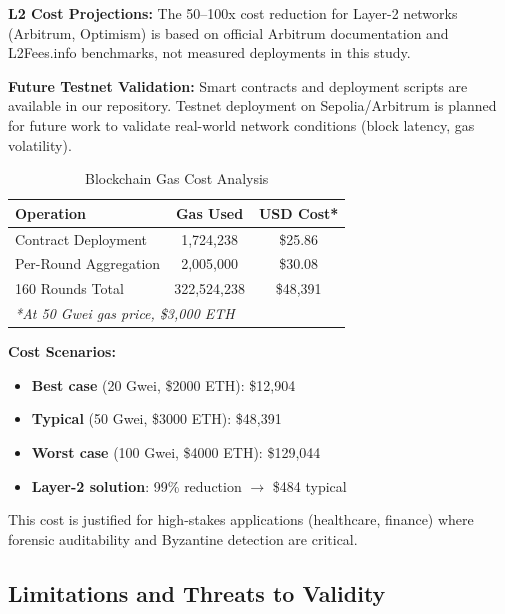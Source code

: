 \documentclass[12pt,a4paper,onecolumn]{article}
\begin{document}
\textbf{L2 Cost Projections:} The 50--100x cost reduction for Layer-2 networks (Arbitrum, Optimism) is based on official Arbitrum documentation and L2Fees.info benchmarks, not measured deployments in this study.

\textbf{Future Testnet Validation:} Smart contracts and deployment scripts are available in our repository. Testnet deployment on Sepolia/Arbitrum is planned for future work to validate real-world network conditions (block latency, gas volatility).

\begin{table}[t]
\caption{Blockchain Gas Cost Analysis}
\label{tab:gas_cost}
\centering
\begin{tabular}{lcc}
\toprule
\textbf{Operation} & \textbf{Gas Used} & \textbf{USD Cost*} \\
\midrule
Contract Deployment & 1,724,238 & \$25.86 \\
Per-Round Aggregation & 2,005,000 & \$30.08 \\
160 Rounds Total & 322,524,238 & \$48,391 \\
\midrule
\multicolumn{3}{l}{\textit{*At 50 Gwei gas price, \$3,000 ETH}} \\
\bottomrule
\end{tabular}
\end{table}

\textbf{Cost Scenarios:}
\begin{itemize}
    \item \textbf{Best case} (20 Gwei, \$2000 ETH): \$12,904
    \item \textbf{Typical} (50 Gwei, \$3000 ETH): \$48,391
    \item \textbf{Worst case} (100 Gwei, \$4000 ETH): \$129,044
    \item \textbf{Layer-2 solution}: 99\% reduction $\rightarrow$ \$484 typical
\end{itemize}

This cost is justified for high-stakes applications (healthcare, finance) where forensic auditability and Byzantine detection are critical.

\subsection{Limitations and Threats to Validity}
\end{document}
